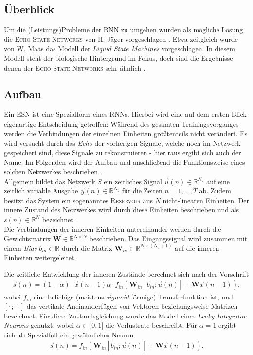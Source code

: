 \subsection{Überblick}
Um die (Leistungs)Probleme der \textsc{RNN} zu umgehen wurden als mögliche Lösung die \textsc{Echo State Networks} von H. Jäger vorgeschlagen \cite{jaeger2010}. Etwa zeitgleich wurde von W. Maas das Modell der \textit{Liquid State Machines} vorgeschlagen. In diesem Modell steht der biologische Hintergrund im Fokus, doch sind die Ergebnisse denen der \textsc{Echo State Networks} sehr ähnlich \citep{Maass2011}. 

\subsection{Aufbau}
Ein \textsc{ESN} ist eine Spezialform eines \textsc{RNN}s. Hierbei wird eine auf dem ersten Blick eigenartige Entscheidung getroffen: Während des gesamten Trainingsvorganges werden die Verbindungen der einzelnen Einheiten größtenteils nicht verändert. Es wird versucht durch das \textit{Echo} der vorherigen Signale, welche noch im Netzwerk gespeichert sind, diese Signale zu rekonstruieren - hier raus ergibt sich auch der Name. Im Folgenden wird der Aufbau und anschließend die Funktionsweise eines solchen Netzwerkes beschrieben \cite{lukoseviciusa2009}.\\

Allgemein bildet das Netzwerk $S$ ein zeitliches Signal $\vec{u}(n) \in \mathbb{R}^{N_u}$  auf eine zeitlich variable Ausgabe $\vec{y}(n) \in \mathbb{R}^{N_y}$ für die Zeiten $n=1, ..., T$ ab. Zudem besitzt das System ein sogenanntes \textsc{Reservoir} aus $N$ nicht-linearen Einheiten. Der innere Zustand des Netzwerkes wird durch diese Einheiten beschrieben und als $s(n) \in \mathbb{R}^{N}$ bezeichnet.\\
Die Verbindungen der inneren Einheiten untereinander werden durch die Gewichtsmatrix $\mathbf{W} \in \mathbb{R}^{N \times N}$ beschrieben. Das Eingangssignal wird zusammen mit einem \textit{Bias} $b_{in} \in \mathbb{R}$ durch die Matrix $\mathbf{W}_{in} \in \mathbb{R}^{N \times (N_u+1)}$ auf die inneren Einheiten weitergeleitet.

Die zeitliche Entwicklung der inneren Zustände berechnet sich nach der Vorschrift
\begin{align}
\label{eq:esn_stateeq}
\vec{s}(n) = (1 - \alpha) \cdot \vec{x}(n-1)  \alpha \cdot f_{in}\left( \mathbf{W}_{in} [b_{in}; \vec{u}(n)] + \mathbf{W} \vec{x}(n-1) \right),
\end{align}
wobei $f_{in}$ eine beliebige (meistens \textit{sigmoid}-förmige) Transferfunktion ist, und $[\cdot\,;\,\cdot]$ das vertikale Aneinanderfügen von Vektoren beziehungsweise Matrizen bezeichnet. Für diese Zustandsgleichung wurde das Modell eines \textit{Leaky Integrator Neurons} genutzt, wobei $\alpha \in (0,1]$ die Verlustrate beschreibt. Für $\alpha=1$ ergibt sich als Spezialfall ein gewöhnliches Neuron
\begin{align}
\vec{s}(n) = f_{in}\left( \mathbf{W}_{in} [b_{in}; \vec{u}(n)] + \mathbf{W} \vec{x}(n-1) \right).
\end{align}

